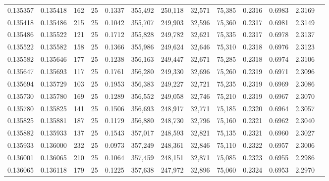 \begin{tabular}{rrrrrrrrrrrrr}
0.135357 & 0.135418 &   162 &  25 &                                     0.1337 & 355,492 & 250,118 &  32,571 &  75,385 & 0.2316 & 0.6983 & 2.3169 \\
0.135418 & 0.135486 &   215 &  25 &                                     0.1042 & 355,707 & 249,903 &  32,596 &  75,360 & 0.2317 & 0.6981 & 2.3149 \\
0.135486 & 0.135522 &   121 &  25 &                                     0.1712 & 355,828 & 249,782 &  32,621 &  75,335 & 0.2317 & 0.6978 & 2.3137 \\
0.135522 & 0.135582 &   158 &  25 &                                     0.1366 & 355,986 & 249,624 &  32,646 &  75,310 & 0.2318 & 0.6976 & 2.3123 \\
0.135582 & 0.135646 &   177 &  25 &                                     0.1238 & 356,163 & 249,447 &  32,671 &  75,285 & 0.2318 & 0.6974 & 2.3106 \\
0.135647 & 0.135693 &   117 &  25 &                                     0.1761 & 356,280 & 249,330 &  32,696 &  75,260 & 0.2319 & 0.6971 & 2.3096 \\
0.135694 & 0.135729 &   103 &  25 &                                     0.1953 & 356,383 & 249,227 &  32,721 &  75,235 & 0.2319 & 0.6969 & 2.3086 \\
0.135730 & 0.135780 &   169 &  25 &                                     0.1289 & 356,552 & 249,058 &  32,746 &  75,210 & 0.2319 & 0.6967 & 2.3070 \\
0.135780 & 0.135825 &   141 &  25 &                                     0.1506 & 356,693 & 248,917 &  32,771 &  75,185 & 0.2320 & 0.6964 & 2.3057 \\
0.135825 & 0.135881 &   187 &  25 &                                     0.1179 & 356,880 & 248,730 &  32,796 &  75,160 & 0.2321 & 0.6962 & 2.3040 \\
0.135882 & 0.135933 &   137 &  25 &                                     0.1543 & 357,017 & 248,593 &  32,821 &  75,135 & 0.2321 & 0.6960 & 2.3027 \\
0.135933 & 0.136000 &   232 &  25 &                                     0.0973 & 357,249 & 248,361 &  32,846 &  75,110 & 0.2322 & 0.6957 & 2.3006 \\
0.136001 & 0.136065 &   210 &  25 &                                     0.1064 & 357,459 & 248,151 &  32,871 &  75,085 & 0.2323 & 0.6955 & 2.2986 \\
0.136065 & 0.136118 &   179 &  25 &                                     0.1225 & 357,638 & 247,972 &  32,896 &  75,060 & 0.2324 & 0.6953 & 2.2970 \\

\end{tabular}

